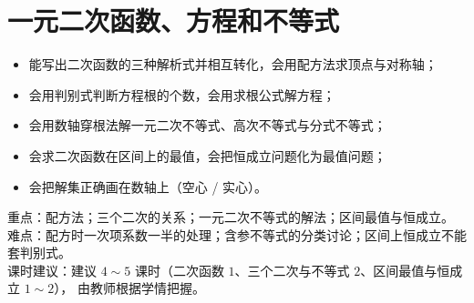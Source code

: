 \chapter{一元二次函数、方程和不等式}

\begin{objective}
\begin{itemize}
  \item 能写出二次函数的三种解析式并相互转化，会用配方法求顶点与对称轴；
  \item 会用判别式判断方程根的个数，会用求根公式解方程；
  \item 会用数轴穿根法解一元二次不等式、高次不等式与分式不等式；
  \item 会求二次函数在区间上的最值，会把恒成立问题化为最值问题；
  \item 会把解集正确画在数轴上（空心 / 实心）。
\end{itemize}
\end{objective}

\begin{keypoint}
重点：配方法；三个二次的关系；一元二次不等式的解法；区间最值与恒成立。\\
难点：配方时一次项系数一半的处理；含参不等式的分类讨论；区间上恒成立不能套判别式。\\
课时建议：建议 $4\sim5$ 课时（二次函数 $1$、三个二次与不等式 $2$、区间最值与恒成立 $1\sim2$），
由教师根据学情把握。
\end{keypoint}

